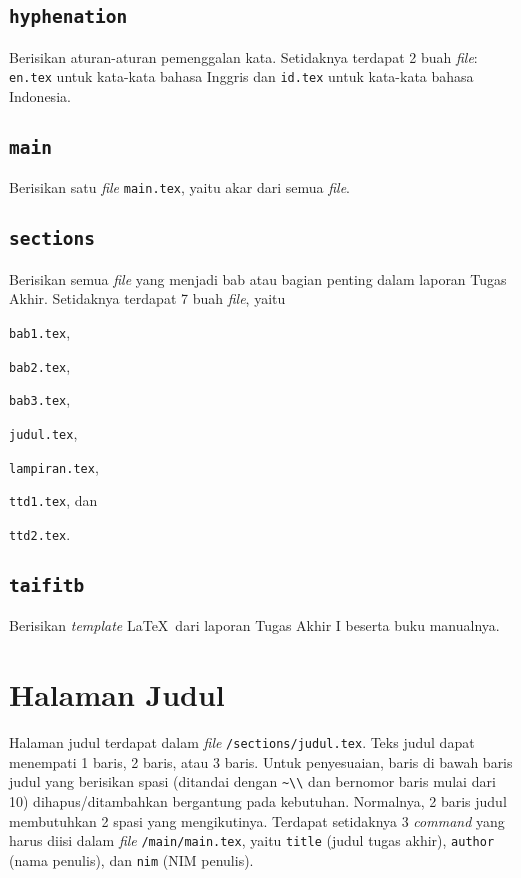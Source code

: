 \documentclass[11pt,a4paper]{article}
\begin{document}
\subsection{\tt hyphenation}
Berisikan aturan-aturan pemenggalan kata. Setidaknya terdapat 2 buah \textit{file}: \verb|en.tex| untuk kata-kata bahasa Inggris dan \verb|id.tex| untuk kata-kata bahasa Indonesia.

\subsection{\tt main}
Berisikan satu \textit{file} \verb|main.tex|, yaitu akar dari semua \textit{file}.

\subsection{\tt sections}
Berisikan semua \textit{file} yang menjadi bab atau bagian penting dalam laporan Tugas Akhir. Setidaknya terdapat 7 buah \textit{file}, yaitu
\begin{inparaenum}
\item \verb|bab1.tex|,
\item \verb|bab2.tex|,
\item \verb|bab3.tex|,
\item \verb|judul.tex|,
\item \verb|lampiran.tex|,
\item \verb|ttd1.tex|, dan
\item \verb|ttd2.tex|.
\end{inparaenum}

\subsection{\tt taifitb}
Berisikan \textit{template} \LaTeX\ dari laporan Tugas Akhir I beserta buku manualnya.

\section{Halaman Judul}
Halaman judul terdapat dalam \textit{file} \verb|/sections/judul.tex|. Teks judul dapat menempati 1 baris, 2 baris, atau 3 baris. Untuk penyesuaian, baris di bawah baris judul yang berisikan spasi (ditandai dengan \verb|~\\| dan bernomor baris mulai dari 10) dihapus/ditambahkan bergantung pada kebutuhan. Normalnya, 2 baris judul membutuhkan 2 spasi yang mengikutinya. Terdapat setidaknya 3 \textit{command} yang harus diisi dalam \textit{file} \verb|/main/main.tex|, yaitu \verb|title| (judul tugas akhir), \verb|author| (nama penulis), dan \verb|nim| (NIM penulis).
\end{document}
